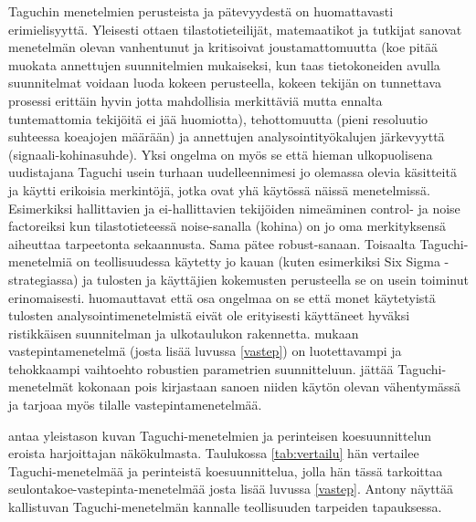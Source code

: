 \documentclass[12pt,a4paper,finnish]{tutthesis}
\begin{document}
Taguchin menetelmien perusteista ja pätevyydestä on huomattavasti erimielisyyttä.
Yleisesti ottaen tilastotieteilijät, matemaatikot ja tutkijat sanovat menetelmän
olevan vanhentunut ja kritisoivat joustamattomuutta (koe pitää muokata
annettujen suunnitelmien mukaiseksi, kun taas tietokoneiden avulla suunnitelmat
voidaan luoda kokeen perusteella,
kokeen tekijän on tunnettava prosessi erittäin hyvin
jotta mahdollisia merkittäviä mutta ennalta tuntemattomia tekijöitä
ei jää huomiotta), tehottomuutta (pieni resoluutio suhteessa
koeajojen määrään) ja annettujen analysointityökalujen järkevyyttä
(signaali-kohinasuhde).
Yksi ongelma on myös se että hieman ulkopuolisena uudistajana Taguchi
usein turhaan uudelleennimesi jo olemassa olevia käsitteitä ja käytti
erikoisia merkintöjä, jotka ovat yhä käytössä näissä menetelmissä.
Esimerkiksi hallittavien ja ei-hallittavien tekijöiden nimeäminen
control- ja noise factoreiksi kun tilastotieteessä noise-sanalla (kohina)
on jo oma merkityksensä aiheuttaa tarpeetonta sekaannusta.
Sama pätee robust-sanaan.
Toisaalta Taguchi-menetelmiä
on teollisuudessa käytetty jo kauan (kuten esimerkiksi Six Sigma -strategiassa)
ja tulosten ja käyttäjien kokemusten perusteella se on usein
toiminut erinomaisesti.
\textcite{Berube1998} huomauttavat että osa ongelmaa on se että
monet käytetyistä tulosten analysointimenetelmistä eivät ole
erityisesti käyttäneet hyväksi ristikkäisen suunnitelman ja ulkotaulukon
rakennetta.
\textcite[s.~554]{Montgomery2012} mukaan vastepintamenetelmä
(josta lisää luvussa \ref{vastep})
on luotettavampi ja tehokkaampi vaihtoehto robustien parametrien suunnitteluun.
\textcite{Sleeper2012} jättää Taguchi-menetelmät kokonaan
pois kirjastaan sanoen niiden käytön olevan vähentymässä ja tarjoaa myös tilalle
vastepintamenetelmää.

\textcite{Antony2006} antaa yleistason kuvan Taguchi-menetelmien ja
perinteisen koesuunnittelun eroista harjoittajan näkökulmasta. Taulukossa \ref{tab:vertailu}
hän vertailee Taguchi-menetelmää ja perinteistä koesuunnittelua, jolla hän
tässä tarkoittaa seulontakoe-vastepinta-menetelmää josta lisää luvussa \ref{vastep}.
Antony näyttää kallistuvan Taguchi-menetelmän kannalle teollisuuden
tarpeiden tapauksessa.
\end{document}
